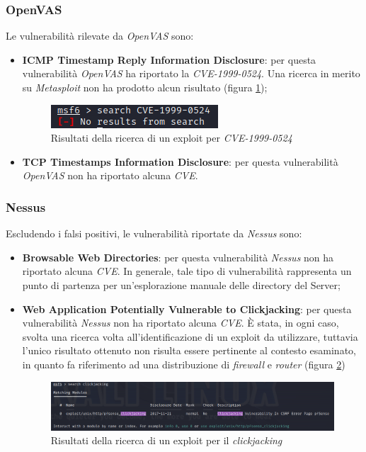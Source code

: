 \subsubsection{OpenVAS}
Le vulnerabilità rilevate da \emph{OpenVAS} sono:
\begin{itemize}
    \item \textbf{ICMP Timestamp Reply Information Disclosure}: per questa vulnerabilità \emph{OpenVAS} ha riportato la \emph{CVE-1999-0524}. Una ricerca in merito su \emph{Metasploit} non ha prodotto alcun risultato (figura \ref{fig:metasploit_trid});
    \begin{figure}[h]
        \centering
        \includegraphics[scale=1]{capitoli/images/metasploit_trid.png}
        \caption{Risultati della ricerca di un exploit per \emph{CVE-1999-0524}}
        \label{fig:metasploit_trid}
    \end{figure}
    \item \textbf{TCP Timestamps Information Disclosure}: per questa vulnerabilità \emph{OpenVAS} non ha riportato alcuna \emph{CVE}. 
\end{itemize}

\subsubsection{Nessus}
Escludendo i falsi positivi, le vulnerabilità riportate da \emph{Nessus} sono:
\begin{itemize}
    \item \textbf{Browsable Web Directories}: per questa vulnerabilità \emph{Nessus} non ha riportato alcuna \emph{CVE}. In generale, tale tipo di vulnerabilità rappresenta un punto di partenza per un'esplorazione manuale delle directory del Server;
    \item \textbf{Web Application Potentially Vulnerable to Clickjacking}: per questa vulnerabilità \emph{Nessus} non ha riportato alcuna \emph{CVE}. È stata, in ogni caso, svolta una ricerca volta all'identificazione di un exploit da utilizzare, tuttavia l'unico risultato ottenuto non risulta essere pertinente al contesto esaminato, in quanto fa riferimento ad una distribuzione di \emph{firewall} e \emph{router} (figura \ref{fig:metasploit_clickjacking}) 
    \begin{figure}[h]
        \centering
        \includegraphics[scale=0.4]{capitoli/images/metasploit_clickjacking.png}
        \caption{Risultati della ricerca di un exploit per il \emph{clickjacking}}
        \label{fig:metasploit_clickjacking}
    \end{figure}
\end{itemize}
